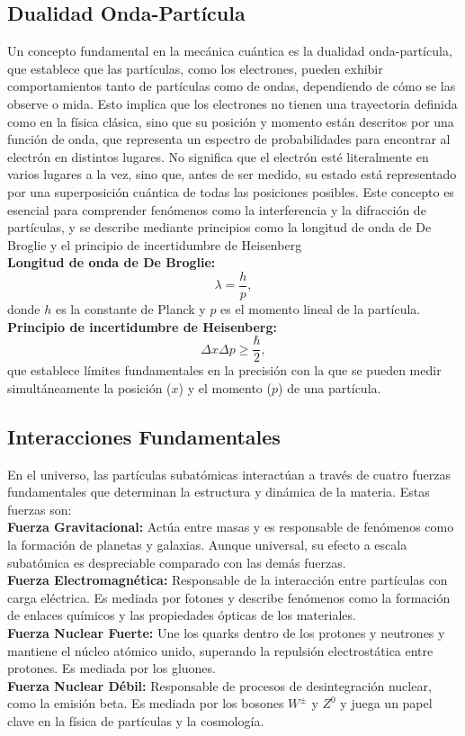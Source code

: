 \subsection*{Dualidad Onda-Partícula}
\noindent
Un concepto fundamental en la mecánica cuántica es la dualidad onda-partícula, que establece que las partículas, como los electrones, pueden exhibir comportamientos tanto de partículas como de ondas, dependiendo de cómo se las observe o mida. Esto implica que los electrones no tienen una trayectoria definida como en la física clásica, sino que su posición y momento están descritos por una función de onda, que representa un espectro de probabilidades para encontrar al electrón en distintos lugares. No significa que el electrón esté literalmente en varios lugares a la vez, sino que, antes de ser medido, su estado está representado por una superposición cuántica de todas las posiciones posibles. Este concepto es esencial para comprender fenómenos como la interferencia y la difracción de partículas, y se describe mediante principios como la longitud de onda de De Broglie y el principio de incertidumbre de Heisenberg\\[0.5em]
\noindent
\textbf{Longitud de onda de De Broglie:}
    \[
    \lambda = \frac{h}{p},
    \]
    donde $h$ es la constante de Planck y $p$ es el momento lineal de la partícula.\\[0.5em]
\noindent
\textbf{Principio de incertidumbre de Heisenberg:}
    \[
    \Delta x \Delta p \geq \frac{\hbar}{2},
    \]
    que establece límites fundamentales en la precisión con la que se pueden medir simultáneamente la posición ($x$) y el momento ($p$) de una partícula.

\subsection*{Interacciones Fundamentales}
\noindent
En el universo, las partículas subatómicas interactúan a través de cuatro fuerzas fundamentales que determinan la estructura y dinámica de la materia. Estas fuerzas son:\\[0.5em]
\noindent
\textbf{Fuerza Gravitacional:} Actúa entre masas y es responsable de fenómenos como la formación de planetas y galaxias. Aunque universal, su efecto a escala subatómica es despreciable comparado con las demás fuerzas.\\[0.5em]
\noindent
\textbf{Fuerza Electromagnética:} Responsable de la interacción entre partículas con carga eléctrica. Es mediada por fotones y describe fenómenos como la formación de enlaces químicos y las propiedades ópticas de los materiales.\\[0.5em]
\noindent
\textbf{Fuerza Nuclear Fuerte:} Une los quarks dentro de los protones y neutrones y mantiene el núcleo atómico unido, superando la repulsión electrostática entre protones. Es mediada por los gluones.\\[0.5em]
\noindent
\textbf{Fuerza Nuclear Débil:} Responsable de procesos de desintegración nuclear, como la emisión beta. Es mediada por los bosones $W^\pm$ y $Z^0$ y juega un papel clave en la física de partículas y la cosmología.

